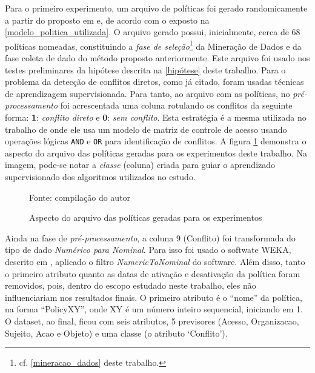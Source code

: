 Para o primeiro experimento, um arquivo de políticas foi gerado randomicamente a partir do proposto em  e, de acordo com o exposto na \autoref{modelo_politica_utilizada}. O arquivo gerado possui, inicialmente, cerca de 68 políticas nomeadas, constituindo a \textit{fase de seleção}\footnote{cf. \autoref{mineracao_dados} deste trabalho.} da Mineração de Dados e da fase coleta de dado do método proposto anteriormente. Este arquivo foi usado nos testes preliminares da hipótese descrita na \autoref{hipótese} deste trabalho. Para o problema da detecção de conflitos diretos, como já citado, foram usadas técnicas de aprendizagem supervisionada. Para tanto, ao arquivo com as políticas, no \textit{pré-processamento }foi acrescentada uma coluna rotulando os conflitos da seguinte forma: \textbf{1}: \textit{conflito direto} e \textbf{0}: \textit{sem conflito}. Esta estratégia é a mesma utilizada no trabalho de  onde ele usa um modelo de matriz de controle de acesso usando operações lógicas \texttt{AND} e \texttt{OR} para identificação de conflitos. A figura \ref{fig:aspecto_arquivo} demonstra o aspecto do arquivo das políticas geradas para os experimentos deste trabalho. Na imagem, pode-se notar a \textit{classe} (coluna) criada para guiar o aprendizado supervisionado dos algoritmos utilizados no estudo.

\begin{figure}[h!]
	\centering
	\caption{Aspecto do arquivo das políticas geradas para os experimentos} %
	
	\label{fig:aspecto_arquivo}
	{\scriptsize Fonte: compilação do autor}
\end{figure}

Ainda na fase de \textit{pré-processamento}, a coluna 9 (Conflito) foi transformada do tipo de dado \textit{Numérico para Nominal}. Para isso foi usado o softwate WEKA, descrito em , aplicado o filtro \textit{NumericToNominal} do software. Além disso, tanto o primeiro atributo quanto as datas de ativação e desativação da política foram removidos, pois, dentro do escopo estudado neste trabalho, eles não influenciariam nos resultados finais. O primeiro atributo é o ``nome'' da política, na forma ``PolicyXY'', onde XY é um número inteiro sequencial, iniciando em 1. O dataset, ao final, ficou com seis atributos, 5 previsores (Acesso, Organizacao, Sujeito, Acao e Objeto) e uma classe (o atributo `Conflito').

